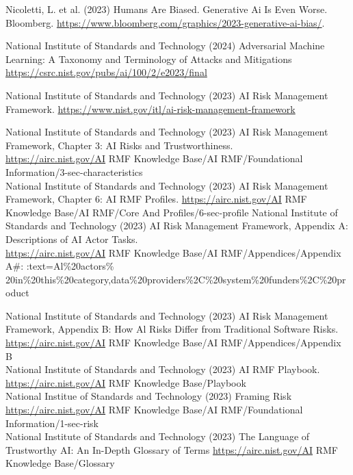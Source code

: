 \documentclass[10pt]{article}
\begin{document}
Nicoletti, L. et al. (2023) Humans Are Biased. Generative Ai Is Even Worse. Bloomberg. \href{https://www.bloomberg.com/graphics/2023-generative-ai-bias/}{https://www.bloomberg.com/graphics/2023-generative-ai-bias/}.

National Institute of Standards and Technology (2024) Adversarial Machine Learning: A Taxonomy and Terminology of Attacks and Mitigations \href{https://csrc.nist.gov/pubs/ai/100/2/e2023/final}{https://csrc.nist.gov/pubs/ai/100/2/e2023/final}

National Institute of Standards and Technology (2023) AI Risk Management Framework. \href{https://www.nist.gov/itl/ai-risk-management-framework}{https://www.nist.gov/itl/ai-risk-management-framework}

National Institute of Standards and Technology (2023) AI Risk Management Framework, Chapter 3: AI Risks and Trustworthiness.\\
\href{https://airc.nist.gov/AI}{https://airc.nist.gov/AI} RMF Knowledge Base/AI RMF/Foundational Information/3-sec-characteristics\\
National Institute of Standards and Technology (2023) AI Risk Management Framework, Chapter 6: AI RMF Profiles. \href{https://airc.nist.gov/AI}{https://airc.nist.gov/AI} RMF Knowledge Base/AI RMF/Core And Profiles/6-sec-profile National Institute of Standards and Technology (2023) AI Risk Management Framework, Appendix A: Descriptions of AI Actor Tasks.\\
\href{https://airc.nist.gov/AI}{https://airc.nist.gov/AI} RMF Knowledge Base/AI RMF/Appendices/Appendix A\#: :text=Al\%20actors\% 20in\%20this\%20category,data\%20providers\%2C\%20system\%20funders\%2C\%20product

National Institute of Standards and Technology (2023) AI Risk Management Framework, Appendix B: How Al Risks Differ from Traditional Software Risks.\\
\href{https://airc.nist.gov/AI}{https://airc.nist.gov/AI} RMF Knowledge Base/AI RMF/Appendices/Appendix B\\
National Institute of Standards and Technology (2023) AI RMF Playbook.\\
\href{https://airc.nist.gov/AI}{https://airc.nist.gov/AI} RMF Knowledge Base/Playbook\\
National Institue of Standards and Technology (2023) Framing Risk\\
\href{https://airc.nist.gov/AI}{https://airc.nist.gov/AI} RMF Knowledge Base/AI RMF/Foundational Information/1-sec-risk\\
National Institute of Standards and Technology (2023) The Language of Trustworthy AI: An In-Depth Glossary of Terms \href{https://airc.nist.gov/AI}{https://airc.nist.gov/AI} RMF Knowledge Base/Glossary
\end{document}

